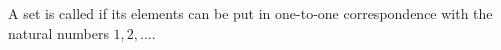 A set is called  if its elements can be put in one-to-one correspondence with the natural numbers $1, 2, \ldots$.
